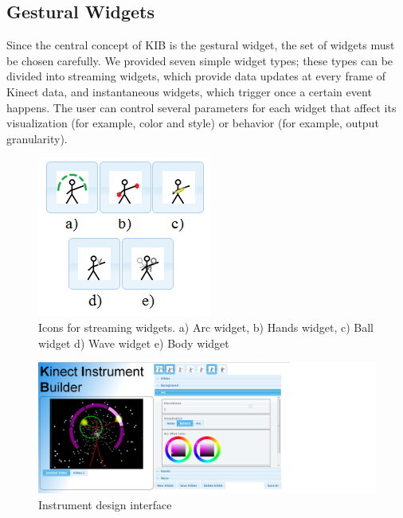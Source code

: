 \documentclass{nime-alternate}
\begin{document}
\subsection{Gestural Widgets}
Since the central concept of KIB is the gestural widget, the set of widgets must be chosen
carefully. We provided seven simple widget types; these types can be divided into streaming
widgets, which provide data updates at every frame of Kinect data, and instantaneous widgets,
which trigger once a certain event happens. The user can control several parameters for each widget
that affect its visualization (for example, color and style) or behavior (for example, output granularity).
\begin{figure}
	\centering
		\includegraphics[width=0.6\columnwidth]{figures/icons.png}
	\caption{Icons for streaming widgets. a) Arc widget, b) Hands widget, c) Ball widget
    d) Wave widget e) Body widget}
	\label{fig:widgeticons}
\end{figure}

\begin{figure}
	\centering
		\includegraphics[width=1\textwidth]{figures/kib.png}
	\caption{Instrument design interface}
	\label{fig:interface}
\end{figure}
\end{document}
